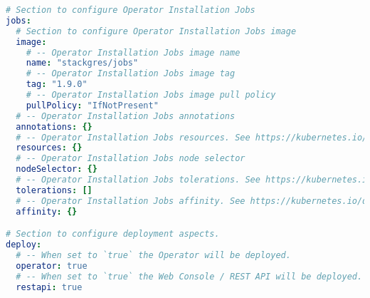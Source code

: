 \begin{lstlisting}[language=yaml, caption=StackGres-Citus - Helm Chart Manifest,captionpos=b,label={lst:stackgres_citus-values.yaml},breaklines=true]
# Section to configure Operator Installation Jobs
jobs:
  # Section to configure Operator Installation Jobs image
  image:
    # -- Operator Installation Jobs image name
    name: "stackgres/jobs"
    # -- Operator Installation Jobs image tag
    tag: "1.9.0"
    # -- Operator Installation Jobs image pull policy
    pullPolicy: "IfNotPresent"
  # -- Operator Installation Jobs annotations
  annotations: {}
  # -- Operator Installation Jobs resources. See https://kubernetes.io/docs/reference/generated/kubernetes-api/v1.27/#resourcerequirements-v1-core
  resources: {}
  # -- Operator Installation Jobs node selector
  nodeSelector: {}
  # -- Operator Installation Jobs tolerations. See https://kubernetes.io/docs/reference/generated/kubernetes-api/v1.27/#toleration-v1-core
  tolerations: []
  # -- Operator Installation Jobs affinity. See https://kubernetes.io/docs/reference/generated/kubernetes-api/v1.27/#affinity-v1-core
  affinity: {}

# Section to configure deployment aspects.
deploy:
  # -- When set to `true` the Operator will be deployed.
  operator: true
  # -- When set to `true` the Web Console / REST API will be deployed.
  restapi: true


\end{lstlisting}
